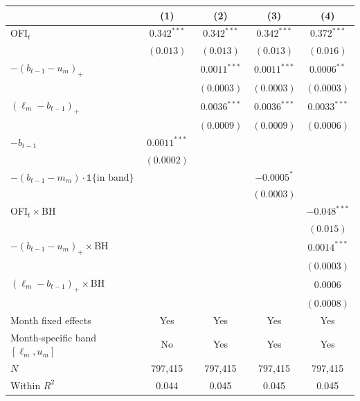 \begin{tabular}{lcccc}
\toprule
 & (1) & (2) & (3) & (4) \\
\midrule
OFI$_t$ & $0.342^{***}$ & $0.342^{***}$ & $0.342^{***}$ & $0.372^{***}$ \\
 & $(0.013)$ & $(0.013)$ & $(0.013)$ & $(0.016)$ \\
$-(b_{t-1}-u_m)_+$ \;[$\kappa^+$] &  & $0.0011^{***}$ & $0.0011^{***}$ & $0.0006^{**}$ \\
 &  & $(0.0003)$ & $(0.0003)$ & $(0.0003)$ \\
$(\ell_m-b_{t-1})_+$ \;[$\kappa^-$] &  & $0.0036^{***}$ & $0.0036^{***}$ & $0.0033^{***}$ \\
 &  & $(0.0009)$ & $(0.0009)$ & $(0.0006)$ \\
$-b_{t-1}$  & $0.0011^{***}$ &  &  &  \\
 & $(0.0002)$ &  &  &  \\
$-(b_{t-1}-m_m)\cdot\mathbb 1\{\text{in band}\}$ &  &  & $-0.0005^{*}$ &  \\
 &  &  & $(0.0003)$ &  \\
OFI$_t\times$BH &  &  &  & $-0.048^{***}$ \\
 &  &  &  & $(0.015)$ \\
$-(b_{t-1}-u_m)_+\times$BH &  &  &  & $0.0014^{***}$ \\
 &  &  &  & $(0.0003)$ \\
$(\ell_m-b_{t-1})_+\times$BH &  &  &  & $0.0006$ \\
 &  &  &  & $(0.0008)$ \\
\midrule
Month fixed effects & Yes & Yes & Yes & Yes \\
Month-specific band $[\ell_m,u_m]$ & No & Yes & Yes & Yes \\
$N$ & 797,415 & 797,415 & 797,415 & 797,415 \\
Within $R^2$ & 0.044 & 0.045 & 0.045 & 0.045 \\
\bottomrule
\end{tabular}
